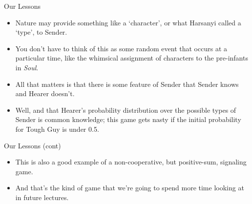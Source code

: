 \documentclass[
  ignorenonframetext,
]{beamer}
\providecommand{\tightlist}{%
  \setlength{\itemsep}{0pt}\setlength{\parskip}{0pt}}
\begin{document}
\begin{frame}{Our Lessons}
\protect\hypertarget{our-lessons}{}
\begin{itemize}
\tightlist
\item
  Nature may provide something like a `character', or what Harsanyi
  called a `type', to Sender.
\item
  You don't have to think of this as some random event that occurs at a
  particular time, like the whimsical assignment of characters to the
  pre-infants in \emph{Soul}.
\item
  All that matters is that there is some feature of Sender that Sender
  knows and Hearer doesn't.
\item
  Well, and that Hearer's probability distribution over the possible
  types of Sender is common knowledge; this game gets nasty if the
  initial probability for Tough Guy is under 0.5.
\end{itemize}
\end{frame}

\begin{frame}{Our Lessons (cont)}
\protect\hypertarget{our-lessons-cont}{}
\begin{itemize}
\tightlist
\item
  This is also a good example of a non-cooperative, but positive-sum,
  signaling game.
\item
  And that's the kind of game that we're going to spend more time
  looking at in future lectures.
\end{itemize}
\end{frame}
\end{document}
